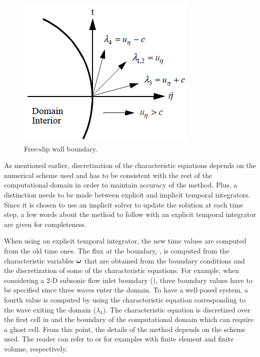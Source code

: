 %
\begin{figure}[H]
\centering
\includegraphics[]{figures/sup_exit_bc.png}
\caption{Free-slip wall boundary.\label{fig:wall_bc}}
\end{figure}
%
As mentioned earlier, discretization of the characteristic equations depends on the numerical scheme used and has to be consistent with the rest of the computational domain in order to maintain accuracy of the method. Plus, a distinction needs to be made between explicit and implicit temporal integrators. Since it is chosen to use an implicit solver to update the solution at each time step, a few words about the method to follow with an explicit temporal integrator are given for completeness. 

When using an explicit temporal integrator, the new time values are computed from the old time ones. The flux at the boundary, , is computed from the characteristic variables $\boldsymbol\omega$ that are obtained from the boundary conditions and the discretization of some of the characteristic equations. For example, when considering a $2$-D subsonic flow inlet boundary (), three boundary values have to be specified since three waves enter the domain. To have a well-posed system, a fourth value is computed by using the characteristic equation corresponding to the wave exiting the domain ($\lambda_4$). The characteristic equation is discretized over the first cell in and the boundary of the computational domain which can require a ghost cell. From this point, the details of the method depends on the scheme used. The reader can refer to \cite{RichThesis} or \cite{SEM} for examples with finite element and finite volume, respectively. 

